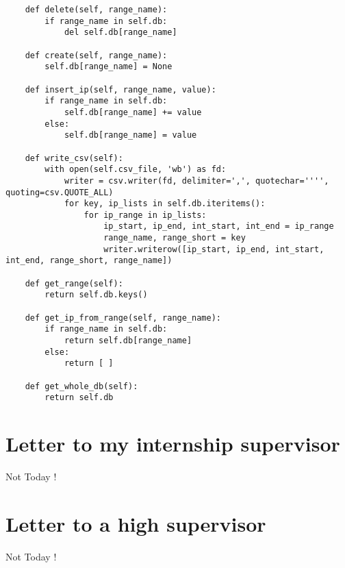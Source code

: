 \documentclass{koala-en}
\begin{document}
\begin{lstlisting}
    def delete(self, range_name):
        if range_name in self.db:
            del self.db[range_name]

    def create(self, range_name):
        self.db[range_name] = None

    def insert_ip(self, range_name, value):
        if range_name in self.db:
            self.db[range_name] += value
        else:
            self.db[range_name] = value

    def write_csv(self):
        with open(self.csv_file, 'wb') as fd:
            writer = csv.writer(fd, delimiter=',', quotechar='''', quoting=csv.QUOTE_ALL)
            for key, ip_lists in self.db.iteritems():
                for ip_range in ip_lists:
                    ip_start, ip_end, int_start, int_end = ip_range
                    range_name, range_short = key
                    writer.writerow([ip_start, ip_end, int_start, int_end, range_short, range_name])

    def get_range(self):
        return self.db.keys()

    def get_ip_from_range(self, range_name):
        if range_name in self.db:
            return self.db[range_name]
        else:
            return [ ]

    def get_whole_db(self):
        return self.db

\end{lstlisting}

\thispagestyle{fancy}

\part{Letter to my internship supervisor}
Not Today !

\thispagestyle{fancy}

\part{Letter to a high supervisor}
Not Today !

\thispagestyle{fancy}
\end{document}
